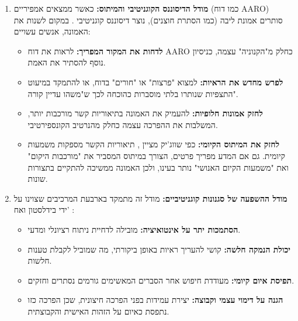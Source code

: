 \documentclass[12pt,a4paper]{article}
\begin{document}
\begin{enumerate}
    \item \textbf{מודל הדיסוננס הקוגניטיבי והמיתוס:} כאשר ממצאים אמפיריים (כמו דוח AARO) סותרים אמונת ליבה (כמו הסתרת חוצנים), נוצר דיסוננס קוגניטיבי \cite{4}. במקום לשנות את האמונה, אנשים עשויים:
    \begin{itemize}
        \item \textbf{לדחות את המקור המפריך:} לראות את דוח AARO כחלק מ"הקנוניה" עצמה, כניסיון נוסף להסתיר את האמת.
        \item \textbf{לפרש מחדש את הראיות:} למצוא "פרצות" או "חורים" בדוח, או להתמקד במיעוט התצפיות שנותרו בלתי מוסברות כהוכחה לכך ש"משהו עדיין קורה".
        \item \textbf{לחזק אמונות חלופיות:} להעמיק את האמונה בתיאוריות קשר מורכבות יותר, המשלבות את ההפרכה עצמה כחלק מהנרטיב הקונספירטיבי.
        \item \textbf{לחזק את המיתוס הקיומי:} כפי שווג'יק מציין \cite{3}, תיאוריות הקשר מספקות משמעות קיומית. גם אם המדע מפריך פרטים, הצורך במיתוס המסביר את "מורכבות היקום" ואת "משמעות הקיום האנושי" נותר בעינו, ולכן האמונה ממשיכה להתקיים בתצורות שונות.
    \end{itemize}
    \item \textbf{מודל ההשפעה של סגנונות קוגניטיביים:} מודל זה מתמקד בארבעת המרכיבים שצוינו על ידי בידלסטון ואח' \cite{4}:
    \begin{itemize}
        \item \textbf{הסתמכות יתר על אינטואיציה:} מובילה לדחיית ניתוח רציונלי ומדעי.
        \item \textbf{יכולת הנמקה חלשה:} קושי להעריך ראיות באופן ביקורתי, מה שמוביל לקבלת טענות חלשות.
        \item \textbf{תפיסת איום קיומי:} מעודדת חיפוש אחר הסברים המאשימים גורמים נסתרים וחזקים.
        \item \textbf{הגנה על דימוי עצמי וקבוצה:} יצירת עמידות בפני הפרכה חיצונית, שכן הפרכה כזו נתפסת כאיום על הזהות האישית והקבוצתית.
    \end{itemize}
\end{enumerate}
\end{document}
